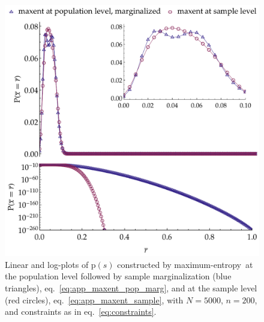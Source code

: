 \documentclass[\ifafour a4paper,12pt,\else a5paper,10pt,\fi%
onecolumn,oneside,article,%
british%
]{memoir}
\theoremstyle{remark}
\theoremstyle{innote}
\newcommand*{\pf}{\mathrm{p}}%
\renewcommand*{\|}{\nonscript\,\vert\nonscript\;\mathopen{}}
\newcommand*{\eqn}{eq.}%
\newcommand*{\yrv}{s}
\newcommand*{\yNv}{N}
\newcommand*{\yrs}{\yrv}%
\newcommand*{\me}{maximum-entropy}
\begin{document}
\begin{figure}[!t]
\centering
\includegraphics[width=\linewidth]{different_maxent_pop_sample_200_realdata_4mom.pdf}%
\caption{Linear and log-plots of $\pf(\yrs)$ constructed by \me\ at
  the population level followed by sample marginalization (blue triangles),
  \eqn~\eqref{eq:app_maxent_pop_marg}, and at the sample level (red
  circles), \eqn~\eqref{eq:app_maxent_sample}, with $\yNv=5000$,
  $n=200$, and constraints as in \eqn~\eqref{eq:constraints}.}
\label{fig:diff_maxent_pop_sample_realdata}
\end{figure}%
\fi%
\end{document}

